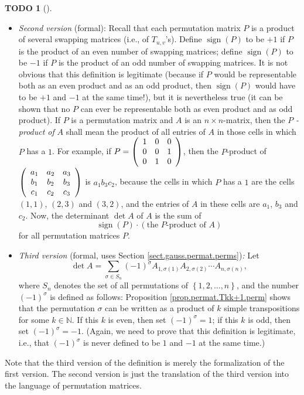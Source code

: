 \documentclass[numbers=enddot,12pt,final,onecolumn,notitlepage]{scrartcl}%
\theoremstyle{definition}
\newtheorem{quest}[theo]{TODO}
\newenvironment{todo}[1][]
{\begin{quest}[#1]\begin{leftbar}}
{\end{leftbar}\end{quest}}
\let\sumnonlimits\sum
\renewcommand{\sum}{\sumnonlimits\limits}
\begin{document}
\begin{todo}
\begin{itemize}
\item \textit{Second version} (formal): Recall that each permutation matrix
$P$ is a product of several swapping matrices (i.e., of $T_{u,v}$'s). Define
$\operatorname*{sign}\left(  P\right)  $ to be $+1$ if $P$ is the product of
an even number of swapping matrices; define $\operatorname*{sign}\left(
P\right)  $ to be $-1$ if $P$ is the product of an odd number of swapping
matrices. It is not obvious that this definition is legitimate (because if $P$
would be representable both as an even product and as an odd product, then
$\operatorname*{sign}\left(  P\right)  $ would have to be $+1$ and $-1$ at the
same time!), but it is nevertheless true (it can be shown that no $P$ can ever
be representable both as even product and as odd product). If $P$ is a
permutation matrix and $A$ is an $n\times n$-matrix, then the $P$%
\textit{-product of }$A$ shall mean the product of all entries of $A$ in those
cells in which $P$ has a $1$. For example, if $P=\left(
\begin{array}
[c]{ccc}%
1 & 0 & 0\\
0 & 0 & 1\\
0 & 1 & 0
\end{array}
\right)  $, then the $P$-product of $\left(
\begin{array}
[c]{ccc}%
a_{1} & a_{2} & a_{3}\\
b_{1} & b_{2} & b_{3}\\
c_{1} & c_{2} & c_{3}%
\end{array}
\right)  $ is $a_{1}b_{3}c_{2}$, because the cells in which $P$ has a $1$ are
the cells $\left(  1,1\right)  $, $\left(  2,3\right)  $ and $\left(
3,2\right)  $, and the entries of $A$ in these cells are $a_{1}$, $b_{3}$ and
$c_{2}$. Now, the determinant $\det A$ of $A$ is the sum of%
\[
\operatorname*{sign}\left(  P\right)  \cdot\left(  \text{the }P\text{-product
of }A\right)
\]
for all permutation matrices $P$.

\item \textit{Third version} (formal, uses Section
\ref{sect.gauss.permat.perms})\textit{:} Let%
\[
\det A=\sum_{\sigma\in S_{n}}\left(  -1\right)  ^{\sigma}A_{1,\sigma\left(
1\right)  }A_{2,\sigma\left(  2\right)  }\cdots A_{n,\sigma\left(  n\right)
},
\]
where $S_{n}$ denotes the set of all permutations of $\left\{  1,2,\ldots
,n\right\}  $, and the number $\left(  -1\right)  ^{\sigma}$ is defined as
follows: Proposition \ref{prop.permat.Tkk+1.perm} shows that the permutation
$\sigma$ can be written as a product of $k$ simple transpositions for some
$k\in\mathbb{N}$. If this $k$ is even, then set $\left(  -1\right)  ^{\sigma
}=1$; if this $k$ is odd, then set $\left(  -1\right)  ^{\sigma}=-1$. (Again,
we need to prove that this definition is legitimate, i.e., that $\left(
-1\right)  ^{\sigma}$ is never defined to be $1$ and $-1$ at the same time.)
\end{itemize}

Note that the third version of the definition is merely the formalization of
the first version. The second version is just the translation of the third
version into the language of permutation matrices.
\end{todo}
\end{document}
